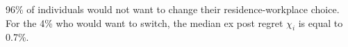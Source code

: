 96\% of individuals would not want to change their residence-workplace choice. For the 4\% who would want to switch, the median ex post regret $\chi_i$ is equal to 0.7\%.%